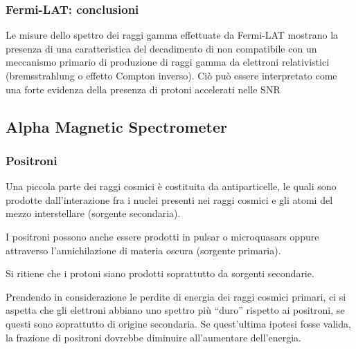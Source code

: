 \documentclass[10pt]{beamer}
\begin{document}
\begin{frame}
  \frametitle{Fermi-LAT: conclusioni}
  Le misure dello spettro dei raggi gamma effettuate da Fermi-LAT mostrano la
  presenza di una \alert{caratteristica del decadimento di \PGpz} non
  compatibile con un meccanismo primario di produzione di raggi gamma da
  elettroni relativistici (bremsstrahlung o effetto Compton inverso).  Ciò può
  essere interpretato come una
  \alert{forte evidenza della presenza di protoni accelerati} nelle SNR
\end{frame}

\subsection{Alpha Magnetic Spectrometer}

\begin{frame}
  \frametitle{Positroni}
  Una piccola parte dei raggi cosmici è costituita da antiparticelle, le quali
  sono prodotte dall'interazione fra i nuclei presenti nei raggi cosmici e gli
  atomi del mezzo interstellare (\alert{sorgente secondaria}).

  I positroni possono anche essere prodotti in pulsar o microquasars oppure
  attraverso l'annichilazione di materia oscura (\alert{sorgente primaria}).

  Si ritiene che i protoni siano
  \alert{prodotti soprattutto da sorgenti secondarie}.

  Prendendo in considerazione le perdite di energia dei raggi cosmici primari,
  ci si aspetta che gli elettroni abbiano uno spettro più ``duro'' rispetto ai
  positroni, se questi sono soprattutto di origine secondaria.  Se quest'ultima
  ipotesi fosse valida,
  \alert{la frazione di positroni dovrebbe diminuire all'aumentare
    dell'energia}.
\end{frame}
\end{document}
